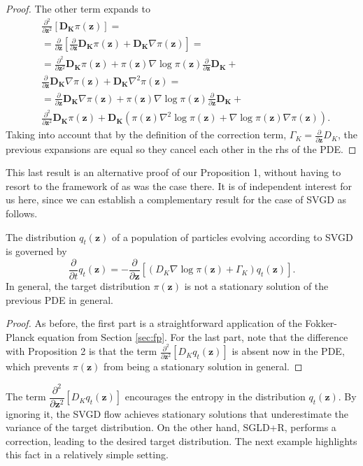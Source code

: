 \begin{proof}
The other term expands to
\begin{align*}
&\frac{\partial^2}{\partial \bm{z}^2} \left[ \mathbf{D_K} \pi(\bm{z})  \right] = \\
&= \frac{\partial}{\partial \bm{z}} \left[ \frac{\partial}{\partial \bm{z}} \mathbf{D_K} \pi(\bm{z}) + \mathbf{D_K} \nabla \pi(\bm{z}) \right] = \\
&= \frac{\partial^2}{\partial \bm{z}^2}\mathbf{D_K} \pi(\bm{z}) + \pi(\bm{z}) \nabla \log \pi(\bm{z}) \frac{\partial}{\partial \bm{z}}\mathbf{D_K} + \\ &\frac{\partial}{\partial \bm{z}}  \mathbf{D_K} \nabla \pi(\bm{z}) + \mathbf{D_K} \nabla^2 \pi(\bm{z}) = \\
&= \frac{\partial}{\partial \bm{z}}  \mathbf{D_K} \nabla \pi(\bm{z}) +
\pi(\bm{z}) \nabla \log \pi(\bm{z}) \frac{\partial}{\partial \bm{z}}\mathbf{D_K} + \\
&\frac{\partial^2}{\partial \bm{z}^2}\mathbf{D_K} \pi(\bm{z})+ 
\mathbf{D_K}(\pi(\bm{z})\nabla^2 \log \pi(\bm{z}) + \nabla \log \pi(\bm{z}) \nabla \pi(\bm{z})).
\end{align*}
Taking into account that by the definition of the correction term, $\Gamma_K = \frac{\partial}{\partial \bm{z}} D_K$, the previous expansions are equal so they cancel each other in the rhs of the PDE.
\end{proof}
This last result is an alternative proof of our Proposition 1, without having to resort to the framework of \cite{ma2015complete} as was the case there. It is of independent interest for us here, since we can establish a complementary result for the case of SVGD as follows.
\begin{proposition}
The distribution $q_t(\bm{z})$ of a population of particles evolving according to SVGD is governed by
$$
\frac{\partial}{\partial t} q_t(\bm{z}) = -\frac{\partial}{\partial \bm{z}} \left[ (D_K \nabla \log \pi(\bm{z}) + \Gamma_K) q_t(\bm{z})\right] .
$$
In general, the target distribution $\pi(\bm{z})$ is not a stationary solution of the previous PDE in general.
\end{proposition}
\begin{proof}
As before, the first part is a straightforward application of the Fokker-Planck equation from Section \ref{sec:fp}. For the last part, note that the difference with Proposition 2 is that the term $\frac{\partial^2}{\partial \bm{z}^2} \left[ D_K q_t(\bm{z})  \right]$ is absent now in the PDE, which prevents $\pi(\bm{z})$ from being a stationary solution in general.
\end{proof}
The term $\dfrac{\partial^2}{\partial \bm{z}^2} \left[ D_K q_t(\bm{z})  \right]$ encourages the entropy in the distribution $q_t(\bm{z})$. By ignoring it, the SVGD flow achieves stationary solutions that underestimate the variance of the target distribution. On the other hand, SGLD+R, performs a correction, leading to the desired target distribution. The next example highlights this fact in a relatively simple setting.

